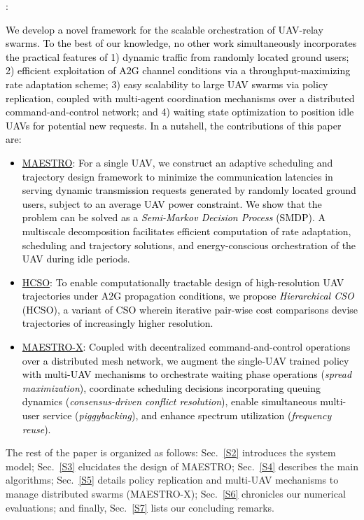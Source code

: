 \documentclass[10pt, twocolumn]{IEEEtran}
\theoremstyle{plain}
\theoremstyle{definition}
\theoremstyle{remark}
\newcommand\hlt[1]{\textcolor{black}{#1}}
\begin{document}
\label{contrib_subs}
\noindent{\hlt{\textbf{Contributions}}}: \hlt{We develop a novel framework for the scalable orchestration of UAV-relay swarms. To the best of our knowledge, no other work simultaneously incorporates the practical features of 1) dynamic traffic from randomly located ground users; 2) efficient exploitation of A2G channel conditions via a throughput-maximizing rate adaptation scheme; 3) easy scalability to large UAV swarms via policy replication, coupled with multi-agent coordination mechanisms over a distributed command-and-control network; and 4) waiting state optimization to position idle UAVs for potential new requests. In a nutshell, the contributions of this paper are:
\begin{itemize}[leftmargin=*]
    \item \underline{MAESTRO}: For a single UAV, we construct an adaptive scheduling and trajectory design framework to minimize the communication latencies in serving dynamic transmission requests generated by randomly located ground users, subject to an average UAV power constraint. We show that the problem can be solved as a \emph{Semi-Markov Decision Process} (SMDP). A multiscale decomposition facilitates efficient computation of rate adaptation, scheduling and trajectory solutions, and energy-conscious orchestration of the UAV during idle periods.
    \item \underline{HCSO}: To enable computationally tractable design of high-resolution UAV trajectories under A2G propagation conditions, we propose \emph{Hierarchical CSO} (HCSO), a variant of CSO wherein iterative pair-wise cost comparisons devise trajectories of increasingly higher resolution.
    \item \underline{MAESTRO-X}: Coupled with decentralized command-and-control operations over a distributed mesh network, we augment the single-UAV trained policy with multi-UAV mechanisms to orchestrate waiting phase operations (\emph{spread maximization}), coordinate scheduling decisions incorporating queuing dynamics (\emph{consensus-driven conflict resolution}), enable simultaneous multi-user service (\emph{piggybacking}), and enhance spectrum utilization (\emph{frequency reuse}).
\end{itemize}}

The rest of the paper is organized as follows: Sec.~\ref{S2} introduces the system model; Sec.~\ref{S3} elucidates the design of MAESTRO; Sec.~\ref{S4} describes the main algorithms; Sec.~\ref{S5} details policy replication and multi-UAV mechanisms to manage distributed swarms (MAESTRO-X); Sec.~\ref{S6} chronicles our numerical evaluations; and finally, Sec.~\ref{S7} lists our concluding remarks.
\vspace{-4mm}
\end{document}
